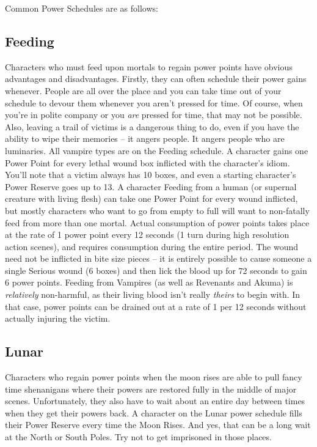 Common Power Schedules are as follows:

\subsection{Feeding}

\hspace{\parindent} Characters who must feed upon mortals to regain power points have obvious advantages and disadvantages. Firstly, they can often schedule their power gains whenever. People are all over the place and you can take time out of your schedule to devour them whenever you aren't pressed for time. Of course, when you're in polite company or you \textit{are} pressed for time, that may not be possible. Also, leaving a trail of victims is a dangerous thing to do, even if you have the ability to wipe their memories -- it angers people. It angers people who are luminaries. All vampire types are on the Feeding schedule. A character gains one Power Point for every lethal wound box inflicted with the character's idiom. You'll note that a victim always has 10 boxes, and even a starting character's Power Reserve goes up to 13. A character Feeding from a human (or supernal creature with living flesh) can take one Power Point for every wound inflicted, but mostly characters who want to go from empty to full will want to non-fatally feed from more than one mortal. Actual consumption of power points takes place at the rate of 1 power point every 12 seconds (1 turn during high resolution action scenes), and requires consumption during the entire period. The wound need not be inflicted in bite size pieces -- it is entirely possible to cause someone a single Serious wound (6 boxes) and then lick the blood up for 72 seconds to gain 6 power points. Feeding from Vampires (as well as Revenants and Akuma) is \textit{relatively} non-harmful, as their living blood isn't really \textit{theirs} to begin with. In that case, power points can be drained out at a rate of 1 per 12 seconds without actually injuring the victim.

\subsection{Lunar}

\hspace{\parindent} Characters who regain power points when the moon rises are able to pull fancy time shenanigans where their powers are restored fully in the middle of major scenes. Unfortunately, they also have to wait about an entire day between times when they get their powers back. A character on the Lunar power schedule fills their Power Reserve every time the Moon Rises. And yes, that can be a long wait at the North or South Poles. Try not to get imprisoned in those places.

